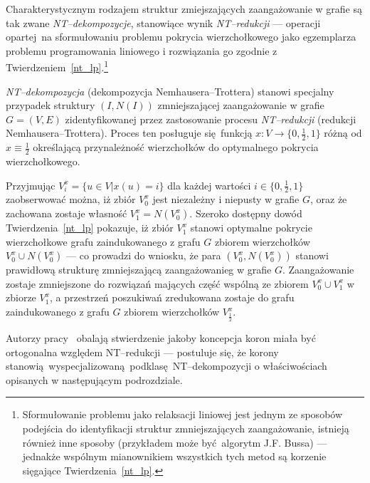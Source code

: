 \par{
  Charakterystycznym rodzajem struktur zmiejszających zaangażowanie w grafie są tak zwane \emph{NT--dekompozycje}, stanowiące wynik \emph{NT--redukcji} --- operacji opartej na sformułowaniu problemu pokrycia wierzchołkowego jako egzemplarza problemu programowania liniowego i rozwiązania go zgodnie z Twierdzeniem~\ref{nt_lp}.\footnote{Sformułowanie problemu jako relaksacji liniowej jest jednym ze sposobów podejścia do identyfikacji struktur zmniejszających zaangażowanie, istnieją również inne sposoby (przykładem może być algorytm J.F. Bussa) --- jednakże wspólnym mianownikiem wszystkich tych metod są korzenie sięgające Twierdzenia~\ref{nt_lp}.}
  \begin{definition}
    \emph{NT--dekompozycja} (dekompozycja Nemhausera--Trottera) stanowi specjalny przypadek struktury $(I, N(I))$ zmniejszającej zaangażowanie w grafie $G=(V, E)$ zidentyfikowanej przez zastosowanie procesu \emph{NT--redukcji} (redukcji Nemhausera--Trottera).
    Proces ten posługuje się funkcją $x: V \rightarrow \{0, \frac{1}{2}, 1\}$ różną od $x \equiv \frac{1}{2}$ określającą przynależność wierzchołków do optymalnego pokrycia wierzchołkowego.
  \end{definition}
  Przyjmując $V_i^x=\{u \in V| x(u)=i\}$ dla każdej wartości $i\in \{0, \frac{1}{2}, 1\}$ zaobserwować można, iż zbiór $V_0^x$ jest niezależny i niepusty w grafie $G$, oraz że zachowana zostaje własność $V_1^x = N(V_0^x)$.
  Szeroko dostępny dowód Twierdzenia~\ref{nt_lp} pokazuje, iż zbiór $V_1^x$ stanowi optymalne pokrycie wierzchołkowe grafu zaindukowanego z grafu $G$ zbiorem wierzchołków $V_0^x \cup N(V_0^x)$ --- co prowadzi do wniosku, że para $(V_0^x, N(V_0^x))$ stanowi prawidłową strukturę zmniejszającą zaangażowanieg w grafie $G$.
  Zaangażowanie zostaje zmniejszone do rozwiązań mających część wspólną ze zbiorem $V_0^x \cup V_1^x$ w zbiorze $V_1^x$, a przestrzeń poszukiwań zredukowana zostaje do grafu zaindukowanego z grafu $G$ zbiorem wierzchołków $V_\frac{1}{2}^x$.
}
\par{
  Autorzy pracy~\cite{chlebik:crown} obalają stwierdzenie jakoby koncepcja koron miała być ortogonalna względem NT--redukcji --- postuluje się, że korony stanowią wyspecjalizowaną podklasę NT--dekompozycji o właściwościach opisanych w następującym podrozdziale.
}
